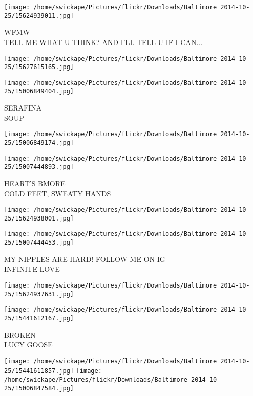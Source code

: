 \documentclass[10pt,letterpaper]{article}
\begin{document}
\vspace{0.25in}
\texttt{[image: /home/swickape/Pictures/flickr/Downloads/Baltimore 2014-10-25/15624939011.jpg]}

WFMW\\
TELL ME WHAT U THINK?  AND I'LL TELL U IF I CAN...
\pagebreak

\texttt{[image: /home/swickape/Pictures/flickr/Downloads/Baltimore 2014-10-25/15627615165.jpg]}

\vspace{0.25in}
\texttt{[image: /home/swickape/Pictures/flickr/Downloads/Baltimore 2014-10-25/15006849404.jpg]}

SERAFINA\\
SOUP
\pagebreak

\texttt{[image: /home/swickape/Pictures/flickr/Downloads/Baltimore 2014-10-25/15006849174.jpg]}

\vspace{0.25in}
\texttt{[image: /home/swickape/Pictures/flickr/Downloads/Baltimore 2014-10-25/15007444893.jpg]}

HEART'S BMORE\\
COLD FEET, SWEATY HANDS
\pagebreak

\texttt{[image: /home/swickape/Pictures/flickr/Downloads/Baltimore 2014-10-25/15624938001.jpg]}

\vspace{0.25in}
\texttt{[image: /home/swickape/Pictures/flickr/Downloads/Baltimore 2014-10-25/15007444453.jpg]}

MY NIPPLES ARE HARD!  FOLLOW ME ON IG\\
INFINITE LOVE
\pagebreak

\texttt{[image: /home/swickape/Pictures/flickr/Downloads/Baltimore 2014-10-25/15624937631.jpg]}

\vspace{0.25in}
\texttt{[image: /home/swickape/Pictures/flickr/Downloads/Baltimore 2014-10-25/15441612167.jpg]}

BROKEN\\
LUCY GOOSE
\pagebreak

\texttt{[image: /home/swickape/Pictures/flickr/Downloads/Baltimore 2014-10-25/15441611857.jpg]}
\texttt{[image: /home/swickape/Pictures/flickr/Downloads/Baltimore 2014-10-25/15006847584.jpg]}
\end{document}
